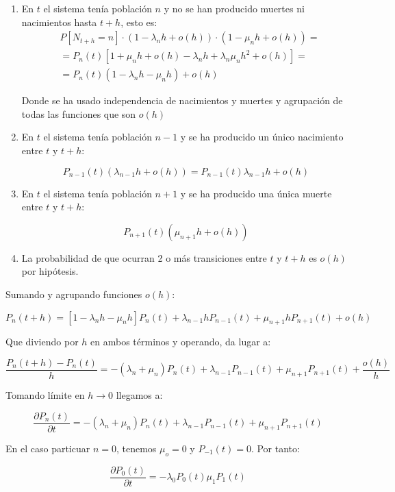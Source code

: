 \documentclass[a4paper,10pt]{scrartcl}
\theoremstyle{definition}
\numberwithin{equation}{section}
\begin{document}
\begin{enumerate}
 \item En $t$ el sistema tenía población $n$ y no se han producido muertes ni nacimientos hasta $t+h$, esto es:
 \begin{align*}
  &  P[N_{t+h}=n] \cdot (1-\lambda_n h + o(h)) \cdot (1-\mu_n h + o(h))= \\
  &= P_n(t)[1+\mu_n h + o(h) -\lambda_n h + \lambda_n \mu_n h^2 + o(h)] = \\
  &= P_n(t)(1-\lambda_n h - \mu_n h) + o(h)
 \end{align*}
 
 Donde se ha usado independencia de nacimientos y muertes y agrupación de todas las funciones que son $o(h)$
 
 \item En $t$ el sistema tenía población $n-1$ y se ha producido un único nacimiento entre $t$ y $t+h$:
 
 \[P_{n-1}(t) (\lambda_{n-1}h + o(h)) = P_{n-1}(t) \lambda_{n-1} h + o(h)\]
 
 \item En $t$ el sistema tenía población $n+1$ y se ha producido una única muerte entre $t$ y $t+h$:
 
 \[P_{n+1}(t) (\mu_{n+1} h + o(h))\]
 
 \item La probabilidad de que ocurran 2 o más transiciones entre $t$ y $t+h$ es $o(h)$ por hipótesis.
\end{enumerate}


Sumando y agrupando funciones $o(h)$:

\[P_n(t+h) = [1-\lambda_n h -\mu_n h] P_n(t) + \lambda_{n-1} h P_{n-1}(t) + \mu_{n+1} h P_{n+1}(t) + o(h)\]


Que diviendo por $h$ en ambos términos y operando, da lugar a:

\[\frac{P_n(t+h) - P_n(t)}{h} = -(\lambda_n + \mu_n) P_n(t) + \lambda_{n-1} P_{n-1}(t) + \mu_{n+1}P_{n+1}(t) + \frac{o(h)}{h}\]

Tomando límite en $h\rightarrow 0$ llegamos a:

\begin{equation}
\frac{\partial P_n(t)}{\partial t} = -(\lambda_n + \mu_n) P_n(t) + \lambda_{n-1}P_{n-1}(t) + \mu_{n+1}P_{n+1}(t)
\label{eq:recp_n(t)}
\end{equation}

En el caso particuar $n=0$, tenemos $\mu_o = 0$ y $P_{-1}(t) = 0$. Por tanto:

\begin{equation}
 \frac{\partial P_0(t)}{\partial t} = -\lambda_0 P_0(t) \mu_{1}P_{1}(t)
 \label{eq:recp_0(t)}
\end{equation}
\end{document}
